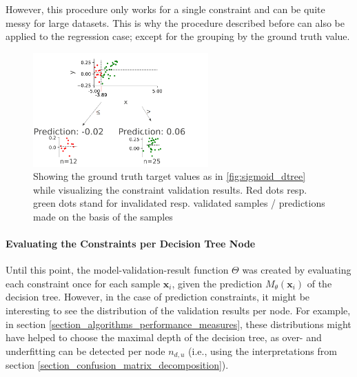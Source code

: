 However, this procedure only works for a single constraint and can be quite messy for large datasets. This is why the procedure described before can also be applied to the regression case; except for the grouping by the ground truth value.

\begin{figure}
    \centering
    \includegraphics[width=0.6\textwidth]{images/visualizations/regression_tree_constraint.png}
    \caption{Showing the ground truth target values as in \ref{fig:sigmoid_dtree} while visualizing the constraint validation results. Red dots resp. green dots stand for invalidated resp. validated samples / predictions made on the basis of the samples}
    \label{fig:constraint_viz_regression_tree}
\end{figure}


\paragraph{Evaluating the Constraints per Decision Tree Node} Until this point, the model-validation-result function $\Theta$ was created by evaluating each constraint once for each sample $\mathbf{x}_i$, given the prediction $M_\theta(\mathbf{x}_i)$ of the decision tree. However, in the case of prediction constraints, it might be interesting to see the distribution of the validation results per node. For example, in section \ref{section_algorithms_performance_measures}, these distributions might have helped to choose the maximal depth of the decision tree, as over- and underfitting can be detected per node $n_{d,u}$ (i.e., using the interpretations from section \ref{section_confusion_matrix_decomposition}).



